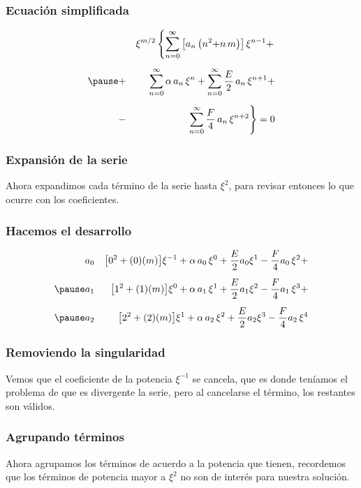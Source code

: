 \begin{frame}
\frametitle{Ecuación simplificada}
\vspace{-1cm}
\begin{eqnarray*}
&{}& \xi^{m/2} \left\{  \sum_{n=0}^{\infty} \left[ a_{n} \left( n^{2} {+} n \, m \right) \right] \xi^{n-1} +  \right. \\[0.5em] \pause
&+& \sum_{n=0}^{\infty} \alpha \, a_{n} \, \xi^{n} + \sum_{n=0}^{\infty} \dfrac{E}{2} \, a_{n} \, \xi^{n+1} + \\[0.5em] 
&-& \left. \sum_{n=0}^{\infty} \dfrac{F}{4} \, a_{n} \, \xi^{n+2} \right\} = 0
\end{eqnarray*}
\end{frame}
\begin{frame}
\frametitle{Expansión de la serie}
Ahora expandimos cada término de la serie hasta $\xi^{2}$, para revisar entonces lo que ocurre con los coeficientes.
\end{frame}
\begin{frame}
\frametitle{Hacemos el desarrollo}
\begin{eqnarray*}
&a_{0}& \big[ 0^{2} + (0)(m) \big] \xi^{-1} + \alpha \, a_{0} \, \xi^{0} + \dfrac{E}{2} a_{0} \xi^{1} - \dfrac{F}{4} a_{0} \, \xi^{2} + \\[0.5em] \pause
&a_{1}& \big[ 1^{2} + (1)(m) \big] \xi^{0} + \alpha \, a_{1} \, \xi^{1} + \dfrac{E}{2} a_{1} \xi^{2} - \dfrac{F}{4} a_{1} \, \xi^{3} + \\[0.5em] \pause
&a_{2}& \big[ 2^{2} + (2)(m) \big] \xi^{1} + \alpha \, a_{2} \, \xi^{2} + \dfrac{E}{2} a_{2} \xi^{3} - \dfrac{F}{4} a_{2} \, \xi^{4}
\end{eqnarray*}
\end{frame}
\begin{frame}
\frametitle{Removiendo la singularidad}
Vemos que el coeficiente de la potencia $\xi^{-1}$ se cancela, que es donde teníamos el problema de que es divergente la serie, pero al cancelarse el término, los restantes son válidos.
\end{frame}
\begin{frame}
\frametitle{Agrupando términos}
Ahora agrupamos los términos de acuerdo a la potencia que tienen, recordemos que los términos de potencia mayor a $\xi^{2}$ no son de interés para nuestra solución.
\end{frame}
